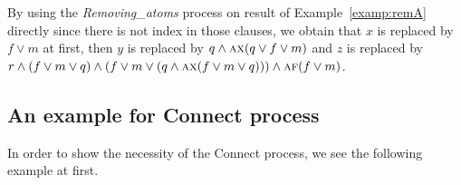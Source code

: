 \documentclass[runningheads]{llncs}
\newcommand{\ALL}{\textsc{a}}
\newcommand{\NEXT}{\textsc{x}}
\newcommand{\FUTURE}{\textsc{f}}
\begin{document}
\begin{example}\label{exa:replace:sub}
By using the \emph{Removing\_atoms} process on result of Example~\ref{examp:remA} directly since there is not index in those clauses, we obtain that $x$ is replaced by $f\vee m$ at first, then $y$ is replaced by $q \wedge \ALL\NEXT(q \vee f\vee m)$ and $z$ is replaced by $r\wedge (f\vee m \vee q) \wedge (f\vee m \vee (q\wedge \ALL\NEXT(f\vee m\vee q))) \wedge \ALL\FUTURE(f \vee m)$.
\end{example}



\subsection{An example for Connect process}
In order to show the necessity of the Connect process, we see the following example at first.
\end{document}
